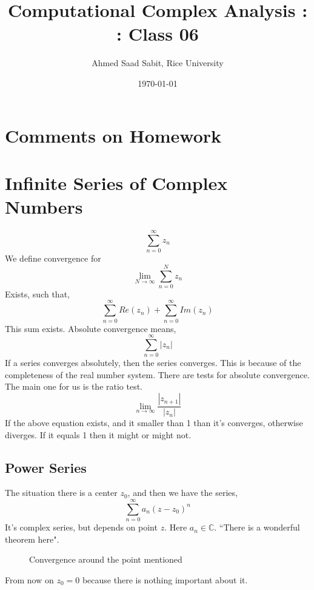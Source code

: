 \documentclass[letter]{article}
\title{Computational Complex Analysis : : Class 06}
\author{Ahmed Saad Sabit, Rice University}
\date{\today}
\begin{document}
\maketitle
\section{Comments on Homework} 

	\section{Infinite Series of Complex Numbers} 
	\[
	\sum_{n=0}^{\infty} z_n
	\] We define convergence for
	\[
	\lim_{N\to \infty} \sum_{n=0}^{N} z_n
	\] Exists, such that,
	\[
	\sum_{n=0}^{\infty} Re(z_n) + \sum_{n=0}^{\infty} Im(z_n)
	\] This sum exists.
	Absolute convergence means, 
	\[
	\sum_{n=0}^{\infty} |z_n|
	\] If a series converges absolutely, then the series converges. This is because of the completeness of the real number system. There are tests for absolute convergence. The main one for us is the ratio test.
	\[
		\lim_{n \to \infty} \frac{|z_{n+1}|}{|z_n|} 
	\] If the above equation exists, and it smaller than 1 than it's converges, otherwise diverges. If it equals 1 then it might or might not. 




	\subsection{Power Series} 
	The situation there is a center $z_0$, and then we have the series, \[
	\sum_{n=0}^{\infty} a_n (z-z_0)^{n}
	\] It's complex series, but depends on point $z$. Here $a_n \in \mathbb{C}$. ``There is a wonderful theorem here".

\begin{figure}[ht]
    \centering
    \caption{Convergence around the point mentioned}
    \label{fig:convergence-around-the-point-mentioned}
\end{figure}
From now on $z_0 = 0$ because there is nothing important about it. 
\end{document}
